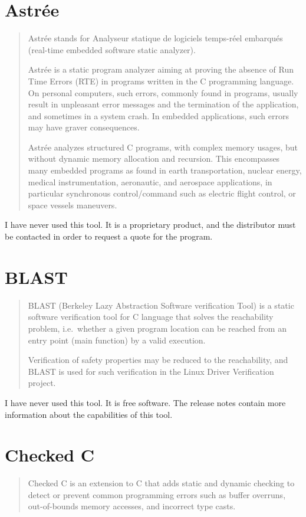 \documentclass[12pt]{article}
\begin{document}
\section{Astrée}
\begin{quote}
Astrée stands for Analyseur statique
de logiciels temps-réel embarqués (real-time embedded software static
analyzer).

Astrée is a static program analyzer aiming at proving the absence of Run
Time Errors (RTE) in programs written in the C programming language.
On personal computers, such errors, commonly found in programs, usually
result in unpleasant error messages and the termination of the application,
and sometimes in a system crash. In embedded applications, such errors may
have graver consequences.

Astrée analyzes structured C programs, with complex memory usages, but
without dynamic memory allocation and recursion. This encompasses many
embedded programs as found in earth transportation, nuclear energy,
medical instrumentation, aeronautic, and aerospace applications, in
particular synchronous control/command such as electric flight control,
or space vessels maneuvers.
\end{quote}

I have never used this tool. It is a proprietary product, and the distributor
must be contacted in order to request a quote for the program.
\cite{astree}
\section{BLAST}
\begin{quote}
BLAST (Berkeley Lazy Abstraction Software verification Tool) is a static
software verification tool for C language that solves the reachability
problem, i.e.\ whether a given program location can be reached from an
entry point (main function) by a valid execution.

Verification of safety properties may be reduced to the reachability,
and BLAST is used for such verification in the Linux Driver Verification
project.
\end{quote}

I have never used this tool. It is free software. The release notes
contain more information about the capabilities of this tool.
\cite{blast}
\section{Checked C}
\begin{quote}
Checked C is an extension to C that adds static and dynamic checking to
detect or prevent common programming errors such as buffer overruns,
out-of-bounds memory accesses, and incorrect type casts.
\end{quote}
\end{document}
